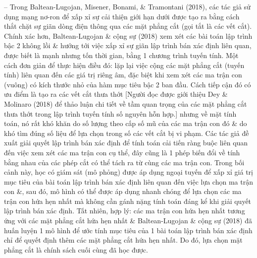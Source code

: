 \documentclass{article}
\begin{document}
\begin{itemize}
\begin{itemize}
\begin{itemize}
            -- Trong Baltean-Lugojan, Misener, Bonami, \& Tramontani (2018), các tác giả sử dụng mạng nơ-ron để xấp xỉ sự cải thiện giới hạn dưới được tạo ra bằng cách thắt chặt sự giãn dòng điện thông qua các mặt phẳng cắt (gọi tắt là các vết cắt). Chính xác hơn, Baltean-Lugojan \& cộng sự (2018) xem xét các bài toán lập trình bậc 2 không lồi \& hướng tới việc xấp xỉ sự giãn lập trình bán xác định liên quan, được biết là mạnh nhưng tốn thời gian, bằng 1 chương trình tuyến tính. Một cách đơn giản để thực hiện điều đó: lặp lại việc cộng các mặt phẳng cắt (tuyến tính) liên quan đến các giá trị riêng âm, đặc biệt khi xem xét các ma trận con (vuông) có kích thước nhỏ của hàm mục tiêu bậc 2 ban đầu. Cách tiếp cận đó có ưu điểm là tạo ra các vết cắt thưa thớt [Người đọc được giới thiệu Dey \& Molinaro (2018) để thảo luận chi tiết về tầm quan trọng của các mặt phẳng cắt thưa thớt trong lập trình tuyến tính số nguyên hỗn hợp.] nhưng về mặt tính toán, nó rất khó khăn do số lượng theo cấp số mũ của các ma trận con đó \& do khó tìm đúng số liệu để lựa chọn trong số các vết cắt bị vi phạm. Các tác giả đề xuất giải quyết lập trình bán xác định để tính toán cải tiến ràng buộc liên quan đến việc xem xét các ma trận con cụ thể, đây cũng là 1 phép biến đổi về tính bằng nhau của các phép cắt có thể tách ra từ cùng các ma trận con. Trong bối cảnh này, học có giám sát (mô phỏng) được áp dụng ngoại tuyến để xấp xỉ giá trị mục tiêu của bài toán lập trình bán xác định liên quan đến việc lựa chọn ma trận con \&, sau đó, mô hình có thể được áp dụng nhanh chóng để lựa chọn các ma trận con hứa hẹn nhất mà không cần gánh nặng tính toán đáng kể khi giải quyết lập trình bán xác định. Tất nhiên, hợp lý: các ma trận con hứa hẹn nhất tương ứng với các mặt phẳng cắt hứa hẹn nhất \& Baltean-Lugojan \& cộng sự (2018) đã huấn luyện 1 mô hình để ước tính mục tiêu của 1 bài toán lập trình bán xác định chỉ để quyết định thêm các mặt phẳng cắt hứa hẹn nhất. Do đó, lựa chọn mặt phẳng cắt là chính sách cuối cùng đã học được.


\end{itemize}
\end{itemize}
\end{itemize}
\end{document}
